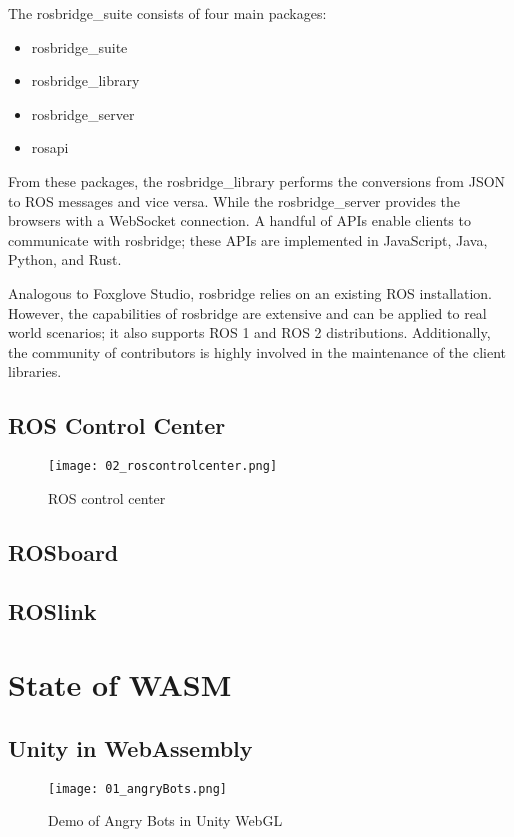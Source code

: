         The \textsf{rosbridge\_suite} consists of four main packages:

        \begin{itemize}
            \item \textsf{rosbridge\_suite}
            \item \textsf{rosbridge\_library}
            \item \textsf{rosbridge\_server}
            \item \textsf{rosapi}
        \end{itemize}

        From these packages, the \textsf{rosbridge\_library} performs the conversions from \ac{JSON} to \ac{ROS} messages and vice versa. While the \textsf{rosbridge\_server} provides the browsers with a WebSocket connection. A handful of \ac{API}s enable clients to communicate with \textsf{rosbridge}; these \ac{API}s are implemented in JavaScript, Java, Python, and Rust.

        Analogous to Foxglove Studio, \textsf{rosbridge} relies on an existing ROS installation. However, the capabilities of \textsf{rosbridge} are extensive and can be applied to real world scenarios; it also supports \ac{ROS} 1 and \ac{ROS} 2 distributions. Additionally, the community of contributors is highly involved in the maintenance of the client libraries.

    \subsection{ROS Control Center}

        \begin{figure}[htbp]
            \centering
            \texttt{[image: 02\_roscontrolcenter.png]}
            \caption{ROS control center}
            \label{fig:roscontrolcenter}
        \end{figure}

    \subsection{ROSboard}

    \subsection{ROSlink}

\section{State of WASM}

    \subsection{Unity in WebAssembly}


    \begin{figure}[htbp]
        \centering
        \texttt{[image: 01\_angryBots.png]}
        \caption{Demo of Angry Bots in Unity WebGL}\label{fig:unity}
    \end{figure}
